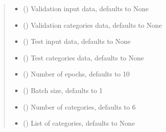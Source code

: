 \documentclass[letterpaper,10pt,english]{sphinxmanual}
\begin{document}
\begin{fulllineitems}
\begin{quote}
\begin{description}
\begin{itemize}
\item {} 
\sphinxAtStartPar
{} (\sphinxstyleliteralemphasis{\sphinxupquote{, }}) \textendash{} Validation input data, defaults to None

\item {} 
\sphinxAtStartPar
{} (\sphinxstyleliteralemphasis{\sphinxupquote{, }}) \textendash{} Validation categories data, defaults to None

\item {} 
\sphinxAtStartPar
{} (\sphinxstyleliteralemphasis{\sphinxupquote{, }}) \textendash{} Test input data, defaults to None

\item {} 
\sphinxAtStartPar
{} (\sphinxstyleliteralemphasis{\sphinxupquote{, }}) \textendash{} Test categories data, defaults to None

\item {} 
\sphinxAtStartPar
{} (\sphinxstyleliteralemphasis{\sphinxupquote{, }}) \textendash{} Number of epochs, defaults to 10

\item {} 
\sphinxAtStartPar
{} (\sphinxstyleliteralemphasis{\sphinxupquote{, }}) \textendash{} Batch size, defaults to 1

\item {} 
\sphinxAtStartPar
{} (\sphinxstyleliteralemphasis{\sphinxupquote{, }}) \textendash{} Number of categories, defaults to 6

\item {} 
\sphinxAtStartPar
{} (\sphinxstyleliteralemphasis{\sphinxupquote{{[}}}\sphinxstyleliteralemphasis{\sphinxupquote{{]}}}\sphinxstyleliteralemphasis{\sphinxupquote{, }}) \textendash{} List of categories, defaults to None


\end{itemize}
\end{description}
\end{quote}
\end{fulllineitems}
\end{document}

